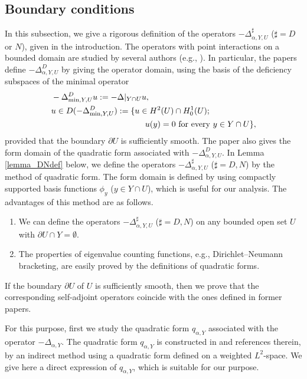 \documentclass[12pt,a4paper]{article}
\def\min{\mathop{\rm min}\limits}
\begin{document}
\subsection{Boundary conditions}
\label{subsection_bdry}
In this subsection,
we give a rigorous definition of the operators $-\Delta^\sharp_{\alpha, Y, U}$
($\sharp=D$ or $N$),  given in the introduction.
The operators with point interactions on a bounded domain 
are studied by several authors (e.g., \cite{Ca-Sw,Bl-Fi-Ma, Lo-Mi}).
In particular,
the papers \cite{Bl-Fi-Ma, Lo-Mi}  define
$-\Delta^D_{\alpha, Y, U}$ by giving the operator domain,
using the basis of
the deficiency subspaces of the minimal operator
\begin{align*}
& -\Delta^D_{\min,Y,U}u
:= -\Delta|_{Y\cap U}u,\\
&u\in D( -\Delta^D_{\min,Y,U})
:=\{u\in H^2(U)\cap H^1_0(U);\\
&\hspace{4cm}u(y)=0\mbox{ for every }y\in Y\cap U\},
\end{align*}
provided that the boundary $\partial U$ 
is sufficiently smooth.
The paper \cite{Lo-Mi} also gives the form domain of the quadratic form
associated with $-\Delta^D_{\alpha, Y, U}$.
In Lemma \ref{lemma_DNdef} below,
we define the operators
$-\Delta^\sharp_{\alpha, Y, U}$ ($\sharp=D,N$)
by the method of quadratic form.
The form domain is defined by using compactly supported basis functions
$\phi_y$ ($y\in Y\cap U$), which is useful for our analysis.
The advantages of this method are as follows.
\begin{enumerate}
 \item[(i)] We can define
the operators
$-\Delta^\sharp_{\alpha, Y, U}$ ($\sharp=D,N$)
on any bounded open set $U$ with $\partial U\cap Y=\emptyset$.


 \item[(ii)] The properties of eigenvalue counting functions,
e.g., Dirichlet--Neumann bracketing,
are easily proved by the definitions of quadratic forms.
\end{enumerate}
If the boundary $\partial U$ of $U$ is sufficiently smooth,
then we prove that the corresponding self-adjoint operators
coincide with the ones defined in former papers.




For this purpose,
first we study the quadratic form $q_{\alpha,Y}$ 
associated with the operator $-\Delta_{\alpha,Y}$.
The quadratic form $q_{\alpha,Y}$  is constructed in 
\cite[Appendix F]{Al-Ge-Ho-Ho} and references therein,
by an indirect method using a quadratic form defined on a weighted $L^2$-space.
We give here a direct expression of $q_{\alpha,Y}$, 
which is suitable for our purpose.
\end{document}
